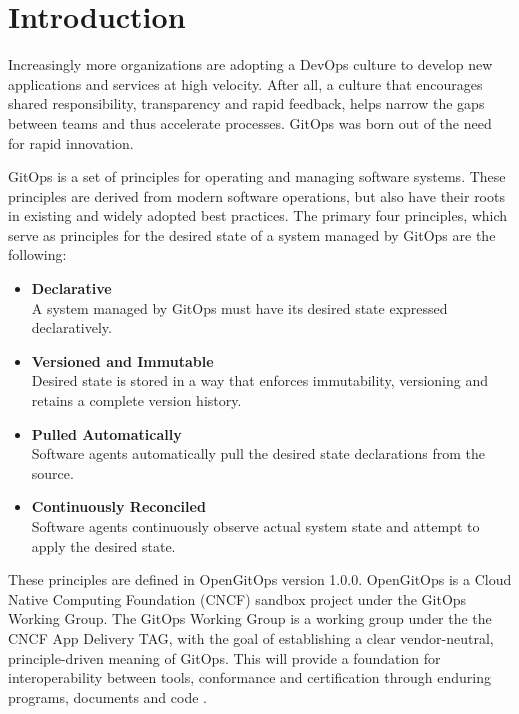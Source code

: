 \chapter{Introduction}


Increasingly more organizations are adopting 
a DevOps culture to develop new applications and services at high velocity. 
After all, a culture that encourages shared responsibility, transparency and rapid feedback, 
helps narrow the gaps between teams and thus accelerate processes.
GitOps was born out of the need for rapid innovation.
\bigskip


\noindent
GitOps is a set of principles for operating and managing software systems.
These principles are derived from modern software operations, but also have their roots 
in existing and widely adopted best practices. The primary four principles,
which serve as principles for the desired state of a
system managed by GitOps are the following:

\begin{itemize}
	\item \textbf{Declarative} \\
		A system managed by GitOps must have its desired state expressed declaratively.
	\item \textbf{Versioned and Immutable} \\
		Desired state is stored in a way that enforces immutability, versioning and retains a complete version history.
	\item \textbf{Pulled Automatically} \\
		Software agents automatically pull the desired state declarations from the source.
	\item \textbf{Continuously Reconciled} \\
		Software agents continuously observe actual system state and attempt to apply the desired state.
\end{itemize}

\noindent
\autocite{gitopsPrinciplesv100}
\bigskip

\noindent
These principles are defined in OpenGitOps version 1.0.0.
OpenGitOps is a Cloud Native Computing Foundation (CNCF) sandbox project under the GitOps Working Group.
The GitOps Working Group is a working group under the
the CNCF App Delivery TAG,
with the goal of establishing a clear vendor-neutral,
principle-driven meaning of GitOps.
This will provide a foundation for interoperability between tools, conformance and certification through enduring programs, documents and code
\autocite{opengitopsDocuments}.
\bigskip

